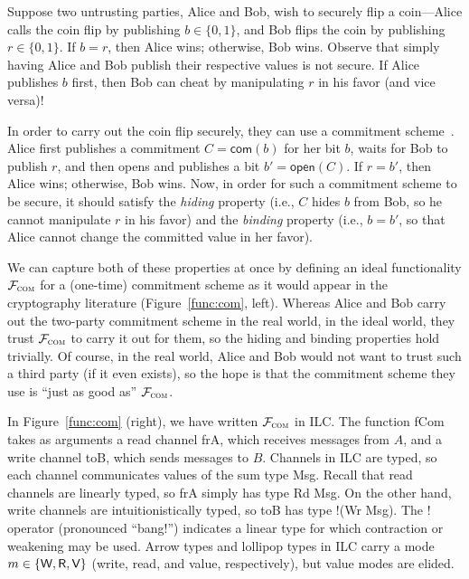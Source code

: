  Suppose two untrusting parties, Alice
and Bob, wish to securely flip a coin---Alice calls the coin flip by publishing $b
\in \{ 0, 1\}$, and Bob flips the coin by publishing $r \in \{0, 1\}$. If $b = r$,
then Alice wins; otherwise, Bob wins. Observe that simply having Alice and Bob
publish their respective values is not secure. If Alice publishes $b$ first,
then Bob can cheat by manipulating $r$ in his favor (and vice versa)!

In order to carry out the coin flip securely, they can use a commitment
scheme~\cite{brassard1988minimum}. Alice first publishes a commitment $C =
\mathsf{com}(b)$ for her bit $b$, waits for Bob to publish $r$, and then opens
and publishes a bit $b' = \mathsf{open}(C)$. If $r = b'$, then Alice wins;
otherwise, Bob wins.  Now, in order for such a commitment scheme to be secure,
it should satisfy the \emph{hiding} property (i.e., $C$ hides $b$ from Bob, so
he cannot manipulate $r$ in his favor) and the \emph{binding} property (i.e.,
$b=b'$, so that Alice cannot change the committed value in her favor).\smallskip

 We can capture both of these properties at
once by defining an ideal functionality $\mathcal{{F}}_{\textsc{com}}$ for a (one-time)
commitment scheme as it would appear in the cryptography literature
(Figure~\ref{func:com}, left). Whereas Alice and Bob carry out the two-party
commitment scheme in the real world, in the ideal world, they trust
$\mathcal{{F}}_{\textsc{com}}$ to carry it out for them, so the hiding and binding
properties hold trivially. Of course, in the real world, Alice and Bob would not
want to trust such a third party (if it even exists), so the hope is that the
commitment scheme they use is ``just as good as'' $\mathcal{{F}}_{\textsc{com}}$.\smallskip

 In Figure~\ref{func:com} (right), we
have written $\mathcal{{F}}_{\textsc{com}}$ in ILC. The function \textsf{fCom} takes as
arguments a read channel \textsf{frA}, which receives messages from $A$, and a
write channel \textsf{toB}, which sends messages to $B$. Channels in ILC are
typed, so each channel communicates values of the sum type \textsf{Msg}. Recall
that read channels are linearly typed, so \textsf{frA} simply has type
\textsf{Rd Msg}. On the other hand, write channels are intuitionistically typed,
so \textsf{toB} has type \textsf{!(Wr Msg)}. The ! operator (pronounced ``bang!'')
indicates a linear type for which contraction or weakening may be used. Arrow
types and lollipop types in ILC carry a mode $m \in \{\textsf{W}, \textsf{R}, \textsf{V}\}$ (write,
read, and value, respectively), but value modes are elided.

